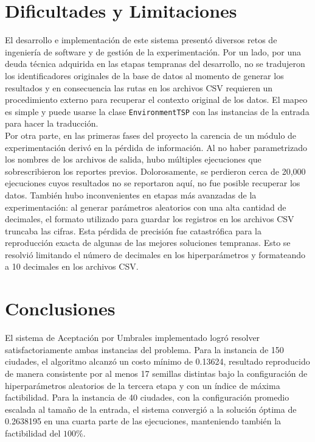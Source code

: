 \documentclass[9pt,a4paper,twocolumn,twoside]{rho-class/rho}
\begin{document}
\section{Dificultades y Limitaciones}
El desarrollo e implementación de este sistema presentó diversos retos de ingeniería de software y de
gestión de la experimentación. Por un lado, por una deuda técnica adquirida en las etapas tempranas del
desarrollo, no se tradujeron los identificadores originales de la base de datos al momento de generar
los resultados y en consecuencia las rutas en los archivos CSV requieren un procedimiento externo para
recuperar el contexto original de los datos. El mapeo es simple y puede usarse la clase
\texttt{EnvironmentTSP} con las instancias de la entrada para hacer la traducción.\\

Por otra parte, en las primeras fases del proyecto la carencia de un módulo de experimentación derivó
en la pérdida de información. Al no haber parametrizado los nombres de los archivos de salida, hubo
múltiples ejecuciones que sobrescribieron los reportes previos. Dolorosamente, se perdieron cerca de
20,000 ejecuciones cuyos resultados no se reportaron aquí, no fue posible recuperar los datos. También
hubo inconvenientes en etapas más avanzadas de la experimentación: al generar parámetros aleatorios con
una alta cantidad de decimales, el formato utilizado para guardar los registros en los archivos CSV
truncaba las cifras. Esta pérdida de precisión fue catastrófica para la reproducción exacta de algunas
de las mejores soluciones tempranas. Esto se resolvió limitando el número de decimales en los
hiperparámetros y formateando a 10 decimales en los archivos CSV.

\section{Conclusiones}
El sistema de Aceptación por Umbrales implementado logró resolver satisfactoriamente ambas instancias
del problema. Para la instancia de 150 ciudades, el algoritmo alcanzó un costo mínimo de 0.13624,
resultado reproducido de manera consistente por al menos 17 semillas distintas bajo la configuración de
hiperparámetros aleatorios de la tercera etapa y con un índice de máxima factibilidad. Para la instancia
de 40 ciudades, con la configuración promedio escalada al tamaño de la entrada, el sistema convergió
a la solución óptima de 0.2638195 en una cuarta parte de las ejecuciones, manteniendo también la
factibilidad del \(100\%\).\\
\end{document}
